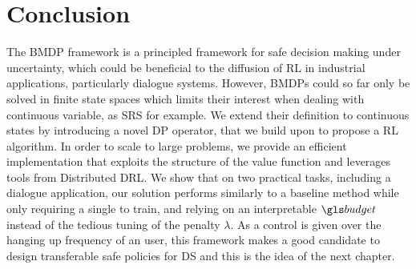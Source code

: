\section{Conclusion}
\label{sec:conclusion}
The \gls{BMDP} framework is a principled framework for safe decision making under uncertainty, which could be beneficial to the diffusion of \gls{RL} in industrial applications, particularly dialogue systems. However, \glspl{BMDP} could so far only be solved in finite state spaces which limits their interest when dealing with continuous variable, as \gls{SRS} for example. We extend their definition to continuous states by introducing a novel \gls{DP} operator, that we build upon to propose a \gls{RL} algorithm. In order to scale to large problems, we provide an efficient implementation that exploits the structure of the value function and leverages tools from Distributed \gls{DRL}. We show that on two practical tasks, including a dialogue application, our solution performs similarly to a baseline  method while only requiring a single  to train, and relying on an interpretable $\budget$ instead of the tedious tuning of the penalty $\lambda$. As a control is given over the hanging up frequency of an user, this framework makes a good candidate to design transferable safe policies for \gls{DS} and this is the idea of the next chapter.






